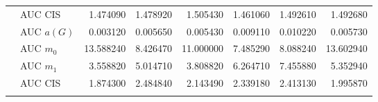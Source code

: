 \begin{table}[htbp]
\begin{tabular}{llrrrrrr}
    & AUC CIS & 1.474090 & 1.478920 & 1.505430 & 1.461060 & 1.492610 & 1.492680 \\
    \addlinespace
    \multirow{4}{*}{random} & AUC $a(G)$ & 0.003120 & 0.005650 & 0.005430 & 0.009110 & 0.010220 & 0.005730 \\
    & AUC $m_0$ & 13.588240 & 8.426470 & 11.000000 & 7.485290 & 8.088240 & 13.602940 \\
    & AUC $m_1$ & 3.558820 & 5.014710 & 3.808820 & 6.264710 & 7.455880 & 5.352940 \\
    & AUC CIS & 1.874300 & 2.484840 & 2.143490 & 2.339180 & 2.413130 & 1.995870 \\
    \addlinespace
    \bottomrule
  \end{tabular}
\end{table}

